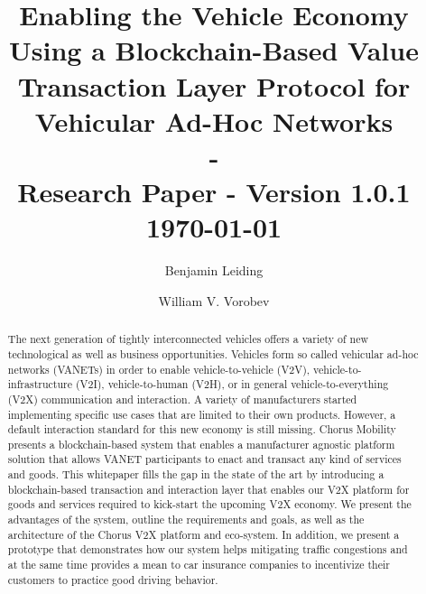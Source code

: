 \documentclass{llncs}
\begin{document}
	{
	\title{Enabling the Vehicle Economy Using a Blockchain-Based Value Transaction Layer Protocol for Vehicular Ad-Hoc Networks\\ - \\ \small Research Paper - Version 1.0.1\\\small \today}
	
	\author{Benjamin Leiding \and William V. Vorobev}
	
	
	\maketitle


	\begin{abstract}


		The next generation of tightly interconnected vehicles offers a variety of new technological as well as  business opportunities. Vehicles form so called vehicular ad-hoc networks (VANETs) in order to enable vehicle-to-vehicle (V2V), vehicle-to-infrastructure (V2I), vehicle-to-human (V2H), or in general vehicle-to-everything (V2X) communication and interaction. A variety of manufacturers started implementing specific use cases that are limited to their own products. However, a default interaction standard for this new economy is still missing. Chorus Mobility presents a blockchain-based system that enables a manufacturer agnostic platform solution that allows VANET participants to enact and transact any kind of services and goods. This whitepaper fills the gap in the state of the art by introducing a blockchain-based transaction and interaction layer that enables our V2X platform for goods and services required to kick-start the upcoming V2X economy. We present the advantages of the system, outline the requirements and goals, as well as the architecture of the Chorus V2X platform and eco-system. In addition, we present a prototype that demonstrates how our system helps mitigating traffic congestions and at the same time provides a mean to car insurance companies to incentivize their customers to practice good driving behavior.
 



\end{abstract}}
\end{document}
